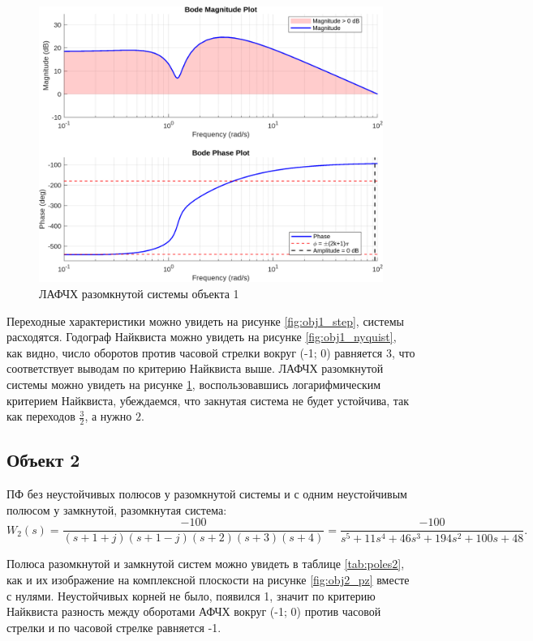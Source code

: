 \begin{figure}[H]
    \centering
    \includegraphics[width=\textwidth]{figs/task_1_obj_1_bode.png}
    \caption{ЛАФЧХ разомкнутой системы объекта 1}
    \label{fig:obj1_bode}
\end{figure}

Переходные характеристики можно увидеть на рисунке \ref{fig:obj1_step},
системы расходятся. Годограф Найквиста можно увидеть на рисунке 
\ref{fig:obj1_nyquist}, как видно, число оборотов против часовой стрелки
вокруг (-1; 0) равняется 3, что соответствует выводам по критерию Найквиста
выше. ЛАФЧХ разомкнутой системы можно увидеть на рисунке \ref{fig:obj1_bode},
воспользовавшись логарифмическим критерием Найквиста, убеждаемся, что 
закнутая система не будет устойчива, так как переходов $\frac{3}{2}$, а нужно $2$.


\newpage
\subsection{Объект 2}

ПФ без неустойчивых полюсов у разомкнутой системы и с одним неустойчивым полюсом у замкнутой,
разомкнутая система:
\begin{equation*}
    W_2(s)=\frac{-100}{(s+1+j)(s+1-j)(s+2)(s+3)(s+4)}=
    \frac{-100}{s^5+11s^4+46s^3+194s^2+100s+48}.
\end{equation*}

Полюса разомкнутой и замкнутой систем можно увидеть в таблице \ref{tab:poles2},
как и их изображение на комплексной плоскости на рисунке \ref{fig:obj2_pz}
вместе с нулями. Неустойчивых корней не было, появился 1, значит по критерию 
Найквиста разность между оборотами АФЧХ вокруг (-1; 0) против часовой стрелки и по часовой стрелке
равняется -1.


